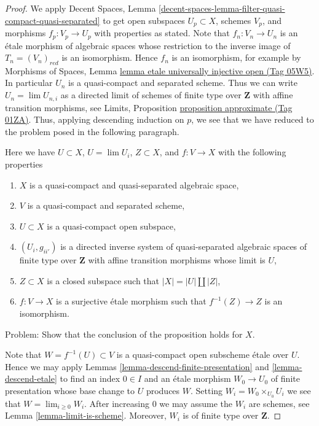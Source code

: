 \documentclass{amsart}
\theoremstyle{plain}
\theoremstyle{definition}
\theoremstyle{remark}
\numberwithin{equation}{subsection}
\def\lim{\mathop{\mathrm{lim}}\nolimits}
\begin{document}
\begin{proof}
We apply Decent Spaces, Lemma
\ref{decent-spaces-lemma-filter-quasi-compact-quasi-separated}
to get open subspaces $U_p \subset X$, schemes $V_p$, and morphisms
$f_p : V_p \to U_p$ with properties as stated. Note that
$f_n : V_n \to U_n$ is an \'etale morphism of algebraic spaces
whose restriction to the inverse image of $T_n = (V_n)_{red}$ is an
isomorphism. Hence $f_n$ is an isomorphism, for example by
Morphisms of Spaces, Lemma
\href{https://stacks.math.columbia.edu/tag/05W5}{lemma etale universally injective open (Tag 05W5)}.
In particular $U_n$ is a quasi-compact and separated scheme.
Thus we can write $U_n = \lim U_{n, i}$ as a directed limit
of schemes of finite type over $\mathbf{Z}$ with affine transition
morphisms, see Limits, Proposition \href{https://stacks.math.columbia.edu/tag/01ZA}{proposition approximate (Tag 01ZA)}.
Thus, applying descending induction on $p$, we see that we have reduced
to the problem posed in the following paragraph.

\medskip\noindent
Here we have $U \subset X$, $U = \lim U_i$, $Z \subset X$, and
$f : V \to X$ with the following properties
\begin{enumerate}
\item $X$ is a quasi-compact and quasi-separated algebraic space,
\item $V$ is a quasi-compact and separated scheme,
\item $U \subset X$ is a quasi-compact open subspace,
\item $(U_i, g_{ii'})$ is a directed inverse system of
quasi-separated algebraic spaces
of finite type over $\mathbf{Z}$ with affine transition morphisms
whose limit is $U$,
\item $Z \subset X$ is a closed subspace such that $|X| = |U| \amalg |Z|$,
\item $f : V \to X$ is a surjective \'etale morphism such that
$f^{-1}(Z) \to Z$ is an isomorphism.
\end{enumerate}
Problem: Show that the conclusion of the proposition holds for $X$.

\medskip\noindent
Note that $W = f^{-1}(U) \subset V$ is a quasi-compact open subscheme
\'etale over $U$. Hence we may apply
Lemmas \ref{lemma-descend-finite-presentation} and \ref{lemma-descend-etale}
to find an index $0 \in I$ and an \'etale morphism $W_0 \to U_0$
of finite presentation whose base change to $U$ produces $W$. Setting
$W_i = W_0 \times_{U_0} U_i$ we see that $W = \lim_{i \geq 0} W_i$. After
increasing $0$ we may assume the $W_i$ are schemes, see
Lemma \ref{lemma-limit-is-scheme}.
Moreover, $W_i$ is of finite type over $\mathbf{Z}$.


\end{proof}
\end{document}
